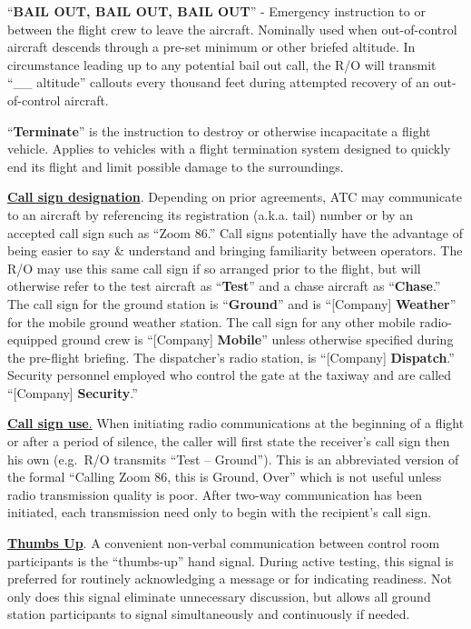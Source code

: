 \documentclass[
]{book}
\begin{document}
``\textbf{BAIL OUT, BAIL OUT, BAIL OUT}'' - Emergency instruction to or between the
flight crew to leave the aircraft. Nominally used when out-of-control aircraft
descends through a pre-set minimum or other briefed altitude. In circumstance
leading up to any potential bail out call, the R/O will transmit ``\_\_ altitude''
callouts every thousand feet during attempted recovery of an out-of-control
aircraft.

``\textbf{Terminate}'' is the instruction to destroy or otherwise incapacitate a flight
vehicle. Applies to vehicles with a flight termination system designed to
quickly end its flight and limit possible damage to the surroundings.

\textbf{\underline{Call sign designation}}. Depending on prior agreements, ATC may
communicate to an aircraft by referencing its registration (a.k.a. tail) number
or by an accepted call sign such as ``Zoom 86.'' Call signs potentially have the
advantage of being easier to say \& understand and bringing familiarity between
operators. The R/O may use this same call sign if so arranged prior to the
flight, but will otherwise refer to the test aircraft as ``\textbf{Test}'' and a chase
aircraft as ``\textbf{Chase}.'' The call sign for the ground station is ``\textbf{Ground}''
and is ``{[}Company{]} \textbf{Weather}'' for the mobile ground weather station. The call
sign for any other mobile radio-equipped ground crew is ``{[}Company{]} \textbf{Mobile}''
unless otherwise specified during the pre-flight briefing. The dispatcher's
radio station, is ``{[}Company{]} \textbf{Dispatch}.'' Security personnel employed who
control the gate at the taxiway and are called ``{[}Company{]} \textbf{Security}.''

\underline{\textbf{Call sign use}.} When initiating radio communications at the
beginning of a flight or after a period of silence, the caller will first state
the receiver's call sign then his own (e.g.~R/O transmits ``Test -- Ground'').
This is an abbreviated version of the formal ``Calling Zoom 86, this is Ground,
Over'' which is not useful unless radio transmission quality is poor. After
two-way communication has been initiated, each transmission need only to begin
with the recipient's call sign.

\textbf{\underline{Thumbs Up}}. A convenient non-verbal communication between
control room participants is the ``thumbs-up'' hand signal. During active testing,
this signal is preferred for routinely acknowledging a message or for indicating
readiness. Not only does this signal eliminate unnecessary discussion, but
allows all ground station participants to signal simultaneously and continuously
if needed.
\end{document}
